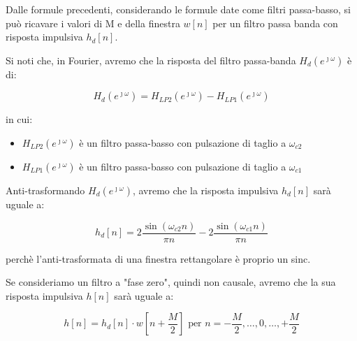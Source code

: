 \newpage 

Dalle formule precedenti, considerando le formule date come filtri passa-basso, si può ricavare i valori di M e della finestra $w \left[ n\right]$ per un filtro passa banda 
con risposta impulsiva $h_d \left[ n\right]$. \newline 

Si noti che, in Fourier, avremo che la risposta del filtro passa-banda $H_d \left(e^{\jmath \omega}\right)$ è di: 

{
    \Large 
    \begin{equation}
        H_d \left(e^{\jmath \omega}\right) 
        = 
        H_{LP2} \left(e^{\jmath \omega}\right) 
        - 
        H_{LP1} \left(e^{\jmath \omega}\right) 
    \end{equation}
}

in cui: 

\begin{itemize}
    \item $H_{LP2} \left(e^{\jmath \omega}\right)$ è un filtro passa-basso con pulsazione di taglio a $\omega_{c2}$ 
    \item $H_{LP1} \left(e^{\jmath \omega}\right)$ è un filtro passa-basso con pulsazione di taglio a $\omega_{c1}$
\end{itemize}

Anti-trasformando $H_d \left(e^{\jmath \omega}\right)$, avremo che la risposta impulsiva $h_d \left[ n\right]$ sarà uguale a: 

{
    \Large 
    \begin{equation}
        h_d \left[ n\right]
        = 
        2 \dfrac{\sin \left(\omega_{c2} n\right)}{\pi n} 
        - 
        2 \dfrac{\sin \left(\omega_{c1} n\right)}{\pi n} 
    \end{equation}
}

perchè l'anti-trasformata di una finestra rettangolare è proprio un sinc. \newline 

Se consideriamo un filtro a "fase zero", quindi non causale, avremo che la sua risposta impulsiva $h \left[ n\right]$ sarà uguale a: 

{
    \Large 
    \begin{equation}
        h \left[ n \right] 
        = 
        h_d \left[ n\right]
        \cdot 
        w \left[ n + \dfrac{M}{2}\right]
        \text{ per } 
        n = - \dfrac{M}{2}, \dots, 0, \dots, + \dfrac{M}{2}  
    \end{equation}
} 

